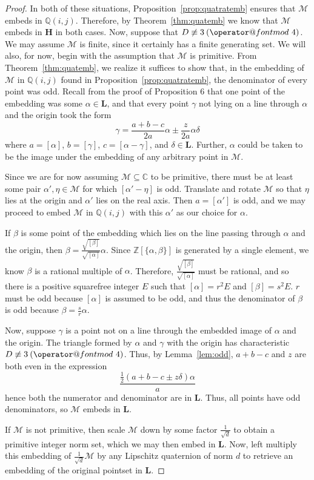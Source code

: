 \documentclass[10pt]{amsart}
\makeatletter
\newcommand{\M}{\mathcal{M}}
\newcommand{\Q}{\mathbb{Q}}
\newcommand{\Z}{\mathbb{Z}}
\newcommand{\C}{\mathbb{C}}
\renewcommand{\L}{\mathbf{L}}
\newcommand{\HH}{\mathbf{H}}
\newcommand{\norm}[1]{\left[#1\right]}
\DeclareRobustCommand{\pmod}{\@pmods}
\def\@pmods#1{\mkern4mu({\operator@font mod}\mkern 6mu#1)}
\makeatother
\begin{document}
\begin{proof}
In both of these situations, Proposition~\ref{prop:quatratemb} ensures that $\M$ embeds in $\Q(i,j)$.  Therefore, by Theorem~\ref{thm:quatemb} we know that $\M$ embeds in $\HH$ in both cases.  Now, suppose that $D \not \equiv 3 \pmod{4}$.  We may assume $\M$ is finite, since it certainly has a finite generating set.  We will also, for now, begin with the assumption that $\M$ is primitive.  From Theorem~\ref{thm:quatemb}, we realize it suffices to show that, in the embedding of $\M$ in $\Q(i,j)$ found in Proposition~\ref{prop:quatratemb}, the denominator of every point was odd.  Recall from the proof of Proposition 6 that one point of the embedding was some $\alpha \in \L$, and that every point $\gamma$ not lying on a line through $\alpha$ and the origin took the form
$$
\gamma = \frac{a+b-c}{2a}\alpha \pm \frac{z}{2a}\alpha \delta
$$
where $a = \norm{\alpha}$, $b = \norm{\gamma}$, $c = \norm{\alpha - \gamma}$, and $\delta \in \L$.  Further, $\alpha$ could be taken to be the image under the embedding of any arbitrary point in $\M$.

Since we are for now assuming $\M \subseteq \C$ to be primitive, there must be at least some pair $\alpha', \eta \in \M$ for which $\norm{\alpha' - \eta}$ is odd.  Translate and rotate $\M$ so that $\eta$ lies at the origin and $\alpha'$ lies on the real axis.  Then $a = \norm{\alpha'}$ is odd, and we may proceed to embed $\M$ in $\Q(i,j)$ with this $\alpha'$ as our choice for $\alpha$.

If $\beta$ is some point of the embedding which lies on the line passing through $\alpha$ and the origin, then $\beta = \frac{\sqrt{\norm{\beta}}}{\sqrt{\norm{\alpha}}} \alpha$.  Since $\Z[\{\alpha, \beta\}]$ is generated by a single element, we know $\beta$ is a rational multiple of $\alpha$.  Therefore, $\frac{\sqrt{\norm{\beta}}}{\sqrt{\norm{\alpha}}}$ must be rational, and so there is a positive squarefree integer $E$ such that $\norm{\alpha} = r^2E$ and $\norm{\beta} = s^2E$.  $r$ must be odd because $\norm{\alpha}$ is assumed to be odd, and thus the denominator of $\beta$ is odd because $\beta = \frac{s}{r}\alpha$.

Now, suppose $\gamma$ is a point not on a line through the embedded image of $\alpha$ and the origin.  The triangle formed by $\alpha$ and $\gamma$ with the origin has characteristic $D \not \equiv 3 \pmod{4}$.  Thus, by Lemma~\ref{lem:odd}, $a+b-c$ and $z$ are both even in the expression
$$
\dfrac{\frac12 (a+b-c \pm z\delta)\alpha}{a}
$$
hence both the numerator and denominator are in $\L$.  Thus, all points have odd denominators, so $\M$ embeds in $\L$.

If $\M$ is not primitive, then scale $\M$ down by some factor $\frac{1}{\sqrt{d}}$ to obtain a primitive integer norm set, which we may then embed in $\L$.  Now, left multiply this embedding of $\frac{1}{\sqrt{d}}\M$ by any Lipschitz quaternion of norm $d$ to retrieve an embedding of the original pointset in $\L$.
\end{proof}
\end{document}

